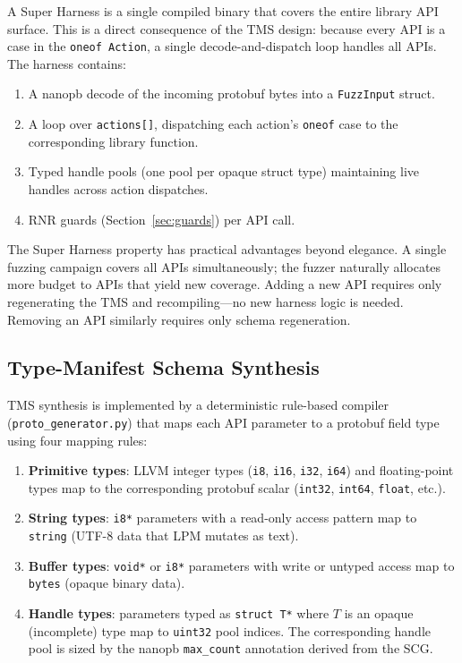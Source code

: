 \documentclass[sigconf,anonymous]{acmart}
\begin{document}
A Super Harness is a single compiled binary that covers the entire
library API surface.  This is a direct consequence of the TMS design:
because every API is a case in the \texttt{oneof Action}, a single
decode-and-dispatch loop handles all APIs.  The harness contains:

\begin{enumerate}[leftmargin=*, label=(\roman*)]
  \item A nanopb decode of the incoming protobuf bytes into a
    \texttt{FuzzInput} struct.
  \item A loop over \texttt{actions[]}, dispatching each action's
    \texttt{oneof} case to the corresponding library function.
  \item Typed handle pools (one pool per opaque struct type) maintaining
    live handles across action dispatches.
  \item RNR guards (Section~\ref{sec:guards}) per API call.
\end{enumerate}

The Super Harness property has practical advantages beyond elegance.
A single fuzzing campaign covers all APIs simultaneously; the fuzzer
naturally allocates more budget to APIs that yield new coverage.
Adding a new API requires only regenerating the TMS and recompiling---no
new harness logic is needed.  Removing an API similarly requires only
schema regeneration.

\subsection{Type-Manifest Schema Synthesis}
\label{sec:tms_synthesis}

TMS synthesis is implemented by a deterministic rule-based compiler
(\texttt{proto\_generator.py}) that maps each API parameter to a
protobuf field type using four mapping rules:

\begin{enumerate}[leftmargin=*, label=\textbf{R\arabic*.}]
  \item \textbf{Primitive types}: LLVM integer types (\texttt{i8},
    \texttt{i16}, \texttt{i32}, \texttt{i64}) and floating-point types
    map to the corresponding protobuf scalar (\texttt{int32},
    \texttt{int64}, \texttt{float}, etc.).
  \item \textbf{String types}: \texttt{i8*} parameters with a read-only
    access pattern map to \texttt{string} (UTF-8 data that LPM mutates
    as text).
  \item \textbf{Buffer types}: \texttt{void*} or \texttt{i8*} parameters
    with write or untyped access map to \texttt{bytes} (opaque binary
    data).
  \item \textbf{Handle types}: parameters typed as \texttt{struct T*}
    where $T$ is an opaque (incomplete) type map to \texttt{uint32}
    pool indices.  The corresponding handle pool is sized by the nanopb
    \texttt{max\_count} annotation derived from the SCG.
\end{enumerate}
\end{document}

